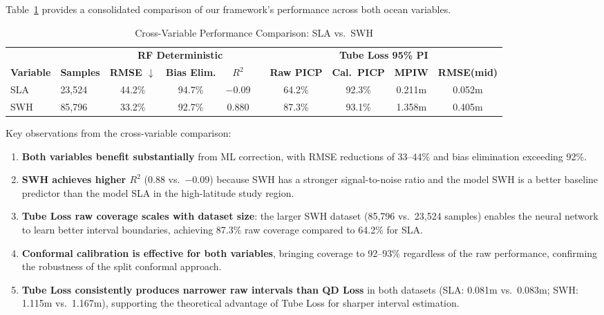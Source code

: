 \documentclass[conference]{IEEEtran}
\begin{document}
Table~\ref{tab:cross_var} provides a consolidated comparison of our framework's performance across both ocean variables.

\begin{table}[t]
\centering
\caption{Cross-Variable Performance Comparison: SLA vs.\ SWH}
\label{tab:cross_var}
\begin{tabular}{@{}llcccccccc@{}}
\toprule
& & \multicolumn{3}{c}{\textbf{RF Deterministic}} & & \multicolumn{4}{c}{\textbf{Tube Loss 95\% PI}} \\
\cmidrule{3-5} \cmidrule{7-10}
\textbf{Variable} & \textbf{Samples} & \textbf{RMSE $\downarrow$} & \textbf{Bias Elim.} & \textbf{$R^2$} & & \textbf{Raw PICP} & \textbf{Cal.\ PICP} & \textbf{MPIW} & \textbf{RMSE(mid)} \\
\midrule
SLA & 23,524 & 44.2\% & 94.7\% & $-$0.09 & & 64.2\% & 92.3\% & 0.211m & 0.052m \\
SWH & 85,796 & 33.2\% & 92.7\% & 0.880 & & 87.3\% & 93.1\% & 1.358m & 0.405m \\
\bottomrule
\end{tabular}
\end{table}

Key observations from the cross-variable comparison:
\begin{enumerate}
    \item \textbf{Both variables benefit substantially} from ML correction, with RMSE reductions of 33--44\% and bias elimination exceeding 92\%.
    \item \textbf{SWH achieves higher $R^2$} (0.88 vs.\ $-$0.09) because SWH has a stronger signal-to-noise ratio and the model SWH is a better baseline predictor than the model SLA in the high-latitude study region.
    \item \textbf{Tube Loss raw coverage scales with dataset size}: the larger SWH dataset (85,796 vs.\ 23,524 samples) enables the neural network to learn better interval boundaries, achieving 87.3\% raw coverage compared to 64.2\% for SLA.
    \item \textbf{Conformal calibration is effective for both variables}, bringing coverage to 92--93\% regardless of the raw performance, confirming the robustness of the split conformal approach.
    \item \textbf{Tube Loss consistently produces narrower raw intervals than QD Loss} in both datasets (SLA: 0.081m vs.\ 0.083m; SWH: 1.115m vs.\ 1.167m), supporting the theoretical advantage of Tube Loss for sharper interval estimation.
\end{enumerate}
\end{document}

